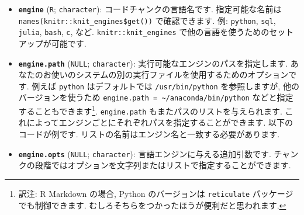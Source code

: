 \documentclass[
  lualatex,ja=standard,jafont=noto-otf]{bxjsreport}
\newenvironment{Shaded}{\begin{snugshade}}{\end{snugshade}}
\newcommand{\AttributeTok}[1]{\textcolor[rgb]{0.13,0.29,0.53}{#1}}
\newcommand{\FunctionTok}[1]{\textcolor[rgb]{0.13,0.29,0.53}{\textbf{#1}}}
\newcommand{\NormalTok}[1]{#1}
\newcommand{\SpecialCharTok}[1]{\textcolor[rgb]{0.81,0.36,0.00}{\textbf{#1}}}
\newcommand{\StringTok}[1]{\textcolor[rgb]{0.31,0.60,0.02}{#1}}
\begin{document}
\begin{itemize}
\item
  \textbf{\texttt{engine}}
  (\texttt{\textquotesingle{}R\textquotesingle{}}; \texttt{character}):
  コードチャンクの言語名です. 指定可能な名前は
  \texttt{names(knitr::knit\_engines\$get())} で確認できます. 例:
  \texttt{python}, \texttt{sql}, \texttt{julia}, \texttt{bash},
  \texttt{c}, など. \texttt{knitr::knit\_engines}
  で他の言語を使うためのセットアップが可能です.
\item
  \textbf{\texttt{engine.path}} (\texttt{NULL}; \texttt{character}):
  実行可能なエンジンのパスを指定します.
  あなたのお使いのシステムの別の実行ファイルを使用するためのオプションです.
  例えば \texttt{python} はデフォルトでは \texttt{/usr/bin/python}
  を参照しますが, 他のバージョンを使うため
  \texttt{engine.path\ =\ \textquotesingle{}\textasciitilde{}/anaconda/bin/python\textquotesingle{}}
  などと指定することもできます\footnote{訳注: R Markdown の場合, Python
    のバージョンは \texttt{reticulate} パッケージでも制御できます.
    むしろそちらをつかったほうが便利だと思われます.}.
  \texttt{engine.path} もまたパスのリストを与えられます.
  これによってエンジンごとにそれぞれパスを指定することができます.
  以下のコードが例です.
  リストの名前はエンジン名と一致する必要があります.

\begin{Shaded}
\end{Shaded}
\item
  \textbf{\texttt{engine.opts}} (\texttt{NULL}; \texttt{character}):
  言語エンジンに与える追加引数です.
  チャンクの段階ではオプションを文字列またはリストで指定することができます.

\begin{Shaded}
\end{Shaded}


\end{itemize}
\end{document}
